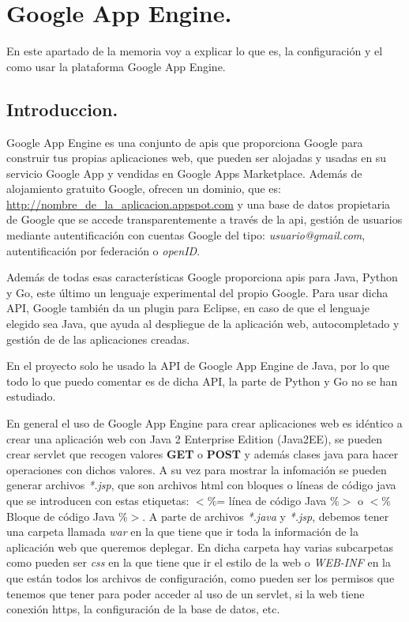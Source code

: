 \chapter{Google App Engine.\label{ref_google_app_engine}}
En este apartado de la memoria voy a explicar lo que es, la configuración y el como usar la plataforma Google App Engine.

\section{Introduccion.\label{ref_introduccion_google_app_engine}}
Google App Engine es una conjunto de apis que proporciona Google para construir tus propias aplicaciones web, que pueden ser alojadas y usadas en su servicio Google App y vendidas en Google Apps Marketplace. Además de alojamiento gratuito Google, ofrecen un dominio, que es: \url{http://nombre\_de\_la\_aplicacion.appspot.com} y una base de datos propietaria de Google que se accede transparentemente a través de la api, gestión de usuarios mediante autentificación con cuentas Google del tipo: \textit{usuario@gmail.com}, autentificación por federación o \textit{openID}.

Además de todas esas características Google proporciona apis para Java, Python y Go, este último un lenguaje experimental del propio Google. Para usar dicha API, Google también da un plugin para Eclipse, en caso de que el lenguaje elegido sea Java, que ayuda al despliegue de la aplicación web, autocompletado y gestión de de las aplicaciones creadas. 

En el proyecto solo he usado la API de Google App Engine de Java, por lo que todo lo que puedo comentar es de dicha API, la parte de Python y Go no se han estudiado.

En general el uso de Google App Engine para crear aplicaciones web es idéntico a crear una aplicación web con Java 2 Enterprise Edition (Java2EE), se pueden crear servlet que recogen valores \textbf{GET} o \textbf{POST} y además clases java para hacer operaciones con dichos valores. A su vez para mostrar la infomación se pueden generar archivos \textit{*.jsp}, que son archivos html con bloques o líneas de código java que se introducen con estas etiquetas: $<$\%= línea de código Java \%$>$ o $<$\% Bloque de código Java \%$>$. A parte de archivos \textit{*.java} y \textit{*.jsp}, debemos tener una carpeta llamada \textit{war} en la que tiene que ir toda la información de la aplicación web que queremos deplegar. En dicha carpeta hay varias subcarpetas como pueden ser \textit{css} en la que tiene que ir el estilo de la web o \textit{WEB-INF} en la que están todos los archivos de configuración, como pueden ser los permisos que tenemos que tener para poder acceder al uso de un servlet, si la web tiene conexión https, la configuración de la base de datos, etc.

